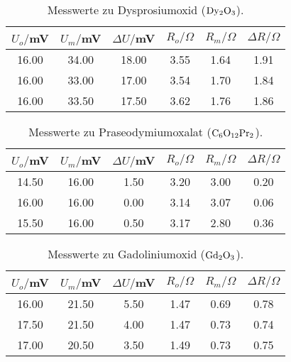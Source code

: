 \begin{table}[htp]
	\begin{center}
    \caption{Messwerte zu Dysprosiumoxid ($\ce{Dy2O3}$).}
    \label{tab:dysprosium}
		\begin{tabular}{cccccc}
			\toprule
						{$U_o/$mV} & {$U_m/$mV} & {$\Delta U/$mV} & {$R_o/\Omega$} & {$R_m/\Omega$} & {$\Delta R/\Omega$}\\
						\midrule
						16.00 & 34.00 & 18.00 & 3.55 & 1.64 & 1.91\\
						16.00 & 33.00 & 17.00 & 3.54 & 1.70 & 1.84\\
						16.00 & 33.50 & 17.50 & 3.62 & 1.76 & 1.86\\
					\bottomrule
		\end{tabular}
	\end{center}
\end{table}


\begin{table}[htp]
	\begin{center}
    \caption{Messwerte zu Praseodymiumoxalat ($\ce{C6O12Pr2}$).}
    \label{tab:seodynumoxid}
		\begin{tabular}{cccccc}
			\toprule
				{$U_o/$mV} & {$U_m/$mV} & {$\Delta U/$mV} & {$R_o/\Omega$} & {$R_m/\Omega$} & {$\Delta R/\Omega$}\\
				\midrule
				14.50 & 16.00 & 1.50 & 3.20 & 3.00 & 0.20\\
				16.00 & 16.00 & 0.00 & 3.14 & 3.07 & 0.06\\
				15.50 & 16.00 & 0.50 & 3.17 & 2.80 & 0.36\\
			\bottomrule
		\end{tabular}
	\end{center}
\end{table}


\begin{table}[htp]
	\begin{center}
    \caption{Messwerte zu Gadoliniumoxid ($\ce{Gd2O3}$).}
    \label{tab:gadolinium}
		\begin{tabular}{cccccc}
			\toprule
				{$U_o/$mV} & {$U_m/$mV} & {$\Delta U/$mV} & {$R_o/\Omega$} & {$R_m/\Omega$} & {$\Delta R/\Omega$}\\
				\midrule
				16.00 & 21.50 & 5.50 & 1.47 & 0.69 & 0.78\\
				17.50 & 21.50 & 4.00 & 1.47 & 0.73 & 0.74\\
				17.00 & 20.50 & 3.50 & 1.49 & 0.73 & 0.75\\
			\bottomrule
		\end{tabular}
	\end{center}
\end{table}



